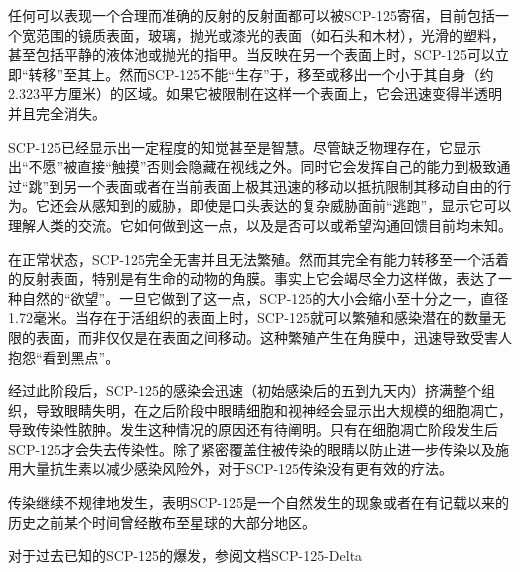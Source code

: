 任何可以表现一个合理而准确的反射的反射面都可以被SCP-125寄宿，目前包括一个宽范围的镜质表面，玻璃，抛光或漆光的表面（如石头和木材），光滑的塑料，甚至包括平静的液体池或抛光的指甲。当反映在另一个表面上时，SCP-125可以立即“转移”至其上。然而SCP-125不能“生存”于，移至或移出一个小于其自身（约2.323平方厘米）的区域。如果它被限制在这样一个表面上，它会迅速变得半透明并且完全消失。

SCP-125已经显示出一定程度的知觉甚至是智慧。尽管缺乏物理存在，它显示出“不愿”被直接“触摸”否则会隐藏在视线之外。同时它会发挥自己的能力到极致通过“跳”到另一个表面或者在当前表面上极其迅速的移动以抵抗限制其移动自由的行为。它还会从感知到的威胁，即使是口头表达的复杂威胁面前“逃跑”，显示它可以理解人类的交流。它如何做到这一点，以及是否可以或希望沟通回馈目前均未知。

在正常状态，SCP-125完全无害并且无法繁殖。然而其完全有能力转移至一个活着的反射表面，特别是有生命的动物的角膜。事实上它会竭尽全力这样做，表达了一种自然的“欲望”。一旦它做到了这一点，SCP-125的大小会缩小至十分之一，直径1.72毫米。当存在于活组织的表面上时，SCP-125就可以繁殖和感染潜在的数量无限的表面，而非仅仅是在表面之间移动。这种繁殖产生在角膜中，迅速导致受害人抱怨“看到黑点”。

经过此阶段后，SCP-125的感染会迅速（初始感染后的五到九天内）挤满整个组织，导致眼睛失明，在之后阶段中眼睛细胞和视神经会显示出大规模的细胞凋亡，导致传染性脓肿。发生这种情况的原因还有待阐明。只有在细胞凋亡阶段发生后SCP-125才会失去传染性。除了紧密覆盖住被传染的眼睛以防止进一步传染以及施用大量抗生素以减少感染风险外，对于SCP-125传染没有更有效的疗法。

传染继续不规律地发生，表明SCP-125是一个自然发生的现象或者在有记载以来的历史之前某个时间曾经散布至星球的大部分地区。

对于过去已知的SCP-125的爆发，参阅文档SCP-125-Delta
